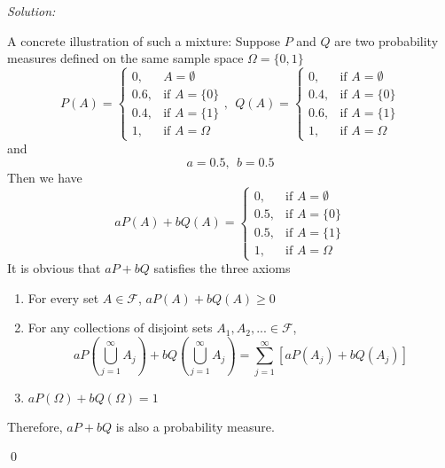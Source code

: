 \documentclass[12pt]{article}
\newenvironment{sol}
    {\emph{Solution:}
    }
    {
    \qed
    }
\begin{document}
\begin{sol}
A concrete illustration of such a mixture: Suppose $P$ and $Q$ are two probability measures defined on the same sample space $\Omega=\{0,1\}$
\[
P(A)=\left\{\begin{array}{ll}
0,&A=\emptyset\\
0.6,&\text{if }A=\{0\}\\
0.4,&\text{if }A=\{1\}\\
1,&\text{if }A=\Omega
\end{array}\right.,~~
Q(A)=\left\{\begin{array}{ll}
0,&\text{if }A=\emptyset\\
0.4,&\text{if }A=\{0\}\\
0.6,&\text{if }A=\{1\}\\
1,&\text{if }A=\Omega
\end{array}\right.
\]
and
\[
a=0.5,~~b=0.5
\]
Then we have
\[
aP(A)+bQ(A)=\left\{\begin{array}{ll}
0,&\text{if }A=\emptyset\\
0.5,&\text{if }A=\{0\}\\
0.5,&\text{if }A=\{1\}\\
1,&\text{if }A=\Omega
\end{array}\right.
\]
It is obvious that $aP+bQ$ satisfies the three axioms
\begin{enumerate}
\item For every set $A\in\mathscr{F}$, $aP(A)+bQ(A)\geq0$
\item For any collections of disjoint sets $A_1, A_2, ...\in\mathscr{F}$, $$aP(\bigcup_{j=1}^{\infty}A_j)+bQ(\bigcup_{j=1}^{\infty}A_j)=\sum_{j=1}^{\infty}[aP(A_j)+bQ(A_j)]$$
\item $aP(\Omega)+bQ(\Omega)=1$
\end{enumerate}
Therefore, $aP+bQ$ is also a probability measure.
\end{sol}
\end{document}
